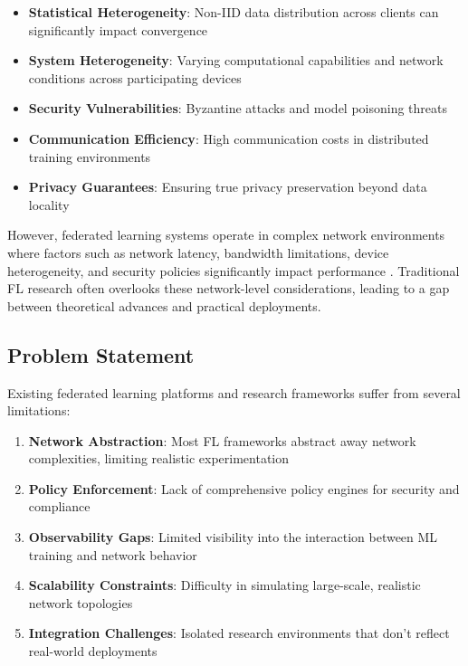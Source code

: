 \begin{itemize}
    \item \textbf{Statistical Heterogeneity}: Non-IID data distribution across clients can significantly impact convergence \cite{zhao2018federated}
    \item \textbf{System Heterogeneity}: Varying computational capabilities and network conditions across participating devices
    \item \textbf{Security Vulnerabilities}: Byzantine attacks and model poisoning threats \cite{blanchard2017machine,fang2020local}
    \item \textbf{Communication Efficiency}: High communication costs in distributed training environments
    \item \textbf{Privacy Guarantees}: Ensuring true privacy preservation beyond data locality
\end{itemize}

However, federated learning systems operate in complex network environments where factors such as network latency, bandwidth limitations, device heterogeneity, and security policies significantly impact performance \cite{bonawitz2019towards}. Traditional FL research often overlooks these network-level considerations, leading to a gap between theoretical advances and practical deployments.

\subsection{Problem Statement}

Existing federated learning platforms and research frameworks suffer from several limitations:

\begin{enumerate}
    \item \textbf{Network Abstraction}: Most FL frameworks abstract away network complexities, limiting realistic experimentation
    \item \textbf{Policy Enforcement}: Lack of comprehensive policy engines for security and compliance
    \item \textbf{Observability Gaps}: Limited visibility into the interaction between ML training and network behavior
    \item \textbf{Scalability Constraints}: Difficulty in simulating large-scale, realistic network topologies
    \item \textbf{Integration Challenges}: Isolated research environments that don't reflect real-world deployments
\end{enumerate}

